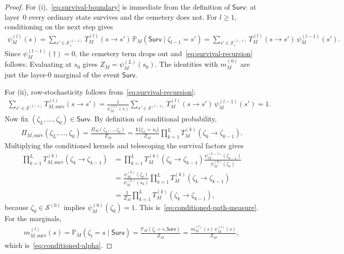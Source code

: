\documentclass[twoside]{article}
\newcommand{\1}{\mathbf{1}}
\begin{document}
\begin{proof}
For (i),~\eqref{eq:survival-boundary} is immediate from the definition of $\mathsf{Surv}$: at
layer~$0$ every ordinary state survives and the cemetery does not.  For $l \ge 1$, conditioning on
the next step gives
\begin{align}
    \psi_M^{(l)}(s)
    =
    \sum_{s' \in \mathcal{S}^{(l-1)}_+}
    T_M^{(l)}(s \to s')\, \mathbb{P}_M(\mathsf{Surv} \mid \zeta_{l-1} = s')
    =
    \sum_{s' \in \mathcal{S}^{(l-1)}_+}
    T_M^{(l)}(s \to s')\, \psi_M^{(l-1)}(s').
\end{align}
Since $\psi_M^{(l-1)}(\dagger)=0$, the cemetery term drops out and~\eqref{eq:survival-recursion}
follows.  Evaluating at $s_0$ gives $Z_M = \psi_M^{(L)}(s_0)$.  The identities with $m_M^{(0)}$ are
just the layer-$0$ marginal of the event $\mathsf{Surv}$.

For (ii), row-stochasticity follows from~\eqref{eq:survival-recursion}:
\begin{align}
    \sum_{s' \in \mathcal{S}^{(l-1)}} T_{M,\mathrm{surv}}^{(l)}(s \to s')
    =
    \frac{1}{\psi_M^{(l)}(s)}
    \sum_{s' \in \mathcal{S}^{(l-1)}} T_M^{(l)}(s \to s')\, \psi_M^{(l-1)}(s')
    = 1.
\end{align}
Now fix $(\zeta_L,\ldots,\zeta_0) \in \mathsf{Surv}$.  By definition of conditional probability,
\begin{align}
    \Pi_{M,\mathrm{surv}}(\zeta_L,\ldots,\zeta_0)
    =
    \frac{\Pi_M(\zeta_L,\ldots,\zeta_0)}{Z_M}
    =
    \frac{\mathbf{1}\{\zeta_L=s_0\}}{Z_M}
    \prod_{k=1}^{L} T_M^{(k)}(\zeta_k \to \zeta_{k-1}).
\end{align}
Multiplying the conditioned kernels and telescoping the survival factors gives
\begin{align}
    \prod_{k=1}^{L} T_{M,\mathrm{surv}}^{(k)}(\zeta_k \to \zeta_{k-1})
    &=
    \prod_{k=1}^{L}
    T_M^{(k)}(\zeta_k \to \zeta_{k-1})
    \frac{\psi_M^{(k-1)}(\zeta_{k-1})}{\psi_M^{(k)}(\zeta_k)} \\
    &=
    \frac{\psi_M^{(0)}(\zeta_0)}{\psi_M^{(L)}(s_0)}
    \prod_{k=1}^{L} T_M^{(k)}(\zeta_k \to \zeta_{k-1}) \\
    &=
    \frac{1}{Z_M}
    \prod_{k=1}^{L} T_M^{(k)}(\zeta_k \to \zeta_{k-1}),
\end{align}
because $\zeta_0 \in \mathcal{S}^{(0)}$ implies $\psi_M^{(0)}(\zeta_0)=1$.  This
is~\eqref{eq:conditioned-path-measure}.  For the marginals,
\begin{align}
    m_{M,\mathrm{surv}}^{(l)}(s)
    =
    \mathbb{P}_M(\zeta_l = s \mid \mathsf{Surv})
    =
    \frac{\mathbb{P}_M(\zeta_l = s, \mathsf{Surv})}{Z_M}
    =
    \frac{m_M^{(l)}(s)\, \psi_M^{(l)}(s)}{Z_M},
\end{align}
which is~\eqref{eq:conditioned-alpha}.


\end{proof}
\end{document}
